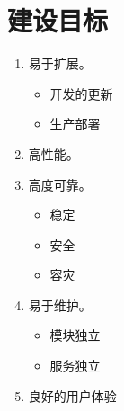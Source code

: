 \section{建设目标}

\begin{enumerate}[label=(\alph*)]
   \item 易于扩展。
     \begin{itemize}
       \item 开发的更新
       \item 生产部署
     \end{itemize}
   \item 高性能。
   \item 高度可靠。
      \begin{itemize}
	     \item 稳定
	     \item 安全
	     \item 容灾
	   \end{itemize}
   \item 易于维护。
      \begin{itemize}
	     \item 模块独立
	     \item 服务独立
	   \end{itemize}
	  
   \item 良好的用户体验
\end{enumerate}

